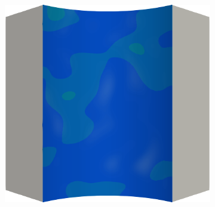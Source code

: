 \begin{frame}
\begin{columns}[T]
\begin{column}{0.6\textwidth}
\begin{figure}
{\begin{subfigure}{0.19\textwidth}
          \end{subfigure}
          \hspace{0.06\textwidth}
          \begin{subfigure}{0.19\textwidth}
            \centering
            \includegraphics[width=\textwidth]{examples/figures/ep.0003}
          \end{subfigure}
        }
        

\end{figure}
\end{column}
\end{columns}
\end{frame}
